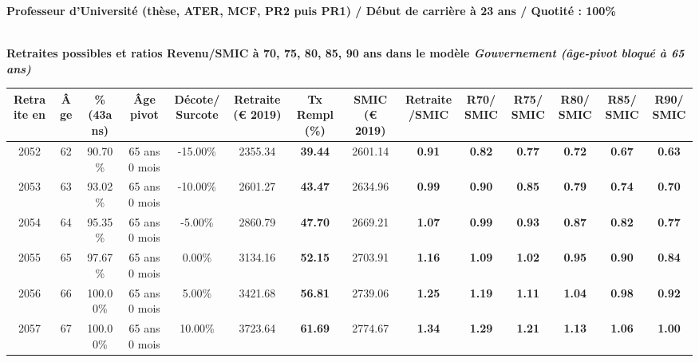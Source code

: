 {\bf \noindent Professeur d'Université (thèse, ATER, MCF, PR2 puis PR1) / Début de carrière à 23 ans / Quotité : 100\%}  ~ 

 ~\\{\bf \noindent Retraites possibles et ratios Revenu/SMIC à 70, 75, 80, 85, 90 ans dans le modèle \emph{Gouvernement (âge-pivot bloqué à 65 ans)}}  
 
\begin{adjustbox}{max width=\textwidth} 
\begin{tabular}[htb]{|c|c||c|c|c||c|c||c|c||c|c|c|c|c|} 
\hline 
 Retraite en &  Âge &  \%(43ans) &  Âge pivot &  Décote/Surcote &  Retraite (\euro{} 2019) &  Tx Rempl(\%) &  SMIC (\euro{} 2019) &  Retraite/SMIC &  R70/SMIC &  R75/SMIC &  R80/SMIC &  R85/SMIC &  R90/SMIC \\ 
\hline \hline 
 2052 &  62 &  90.70\% &  65 ans 0 mois &  -15.00\% &  2355.34 &  {\bf 39.44} &  2601.14 &  {\bf {\color{red} 0.91}} &  {\bf {\color{red} 0.82}} &  {\bf {\color{red} 0.77}} &  {\bf {\color{red} 0.72}} &  {\bf {\color{red} 0.67}} &  {\bf {\color{red} 0.63}} \\ 
\hline 
 2053 &  63 &  93.02\% &  65 ans 0 mois &  -10.00\% &  2601.27 &  {\bf 43.47} &  2634.96 &  {\bf {\color{red} 0.99}} &  {\bf {\color{red} 0.90}} &  {\bf {\color{red} 0.85}} &  {\bf {\color{red} 0.79}} &  {\bf {\color{red} 0.74}} &  {\bf {\color{red} 0.70}} \\ 
\hline 
 2054 &  64 &  95.35\% &  65 ans 0 mois &  -5.00\% &  2860.79 &  {\bf 47.70} &  2669.21 &  {\bf 1.07} &  {\bf {\color{red} 0.99}} &  {\bf {\color{red} 0.93}} &  {\bf {\color{red} 0.87}} &  {\bf {\color{red} 0.82}} &  {\bf {\color{red} 0.77}} \\ 
\hline 
 2055 &  65 &  97.67\% &  65 ans 0 mois &  0.00\% &  3134.16 &  {\bf 52.15} &  2703.91 &  {\bf 1.16} &  {\bf 1.09} &  {\bf 1.02} &  {\bf {\color{red} 0.95}} &  {\bf {\color{red} 0.90}} &  {\bf {\color{red} 0.84}} \\ 
\hline 
 2056 &  66 &  100.00\% &  65 ans 0 mois &  5.00\% &  3421.68 &  {\bf 56.81} &  2739.06 &  {\bf 1.25} &  {\bf 1.19} &  {\bf 1.11} &  {\bf 1.04} &  {\bf {\color{red} 0.98}} &  {\bf {\color{red} 0.92}} \\ 
\hline 
 2057 &  67 &  100.00\% &  65 ans 0 mois &  10.00\% &  3723.64 &  {\bf 61.69} &  2774.67 &  {\bf 1.34} &  {\bf 1.29} &  {\bf 1.21} &  {\bf 1.13} &  {\bf 1.06} &  {\bf {\color{red} 1.00}} \\ 
\hline 
\hline 
\end{tabular} 
\end{adjustbox} 
 
